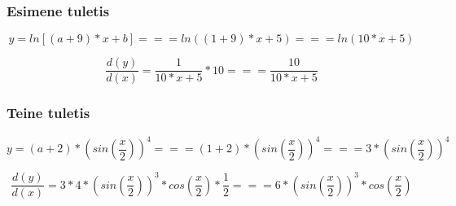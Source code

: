 \documentclass[
]{article}
\begin{document}
\hypertarget{esimene-tuletis}{%
\subsubsection{Esimene tuletis}\label{esimene-tuletis}}

\[y = ln[(a + 9) * x + b] === ln((1 + 9) * x + 5) === ln(10 * x + 5)\]

\[\frac{d(y)}{d(x)} = \frac{1}{10 * x + 5} * 10 === \frac{10}{10 * x + 5}\]

\hypertarget{teine-tuletis}{%
\subsubsection{Teine tuletis}\label{teine-tuletis}}

\[y = (a + 2) * (sin(\frac{x}{2})) ^ 4 === (1 + 2) * (sin(\frac{x}{2})) ^ 4 === 3 * (sin(\frac{x}{2})) ^ 4\]

\[\frac{d(y)}{d(x)} = 3 * 4 * (sin(\frac{x}{2})) ^ 3 * cos(\frac{x}{2}) * \frac{1}{2} === 6 * (sin(\frac{x}{2})) ^ 3 * cos(\frac{x}{2})\]
\end{document}
